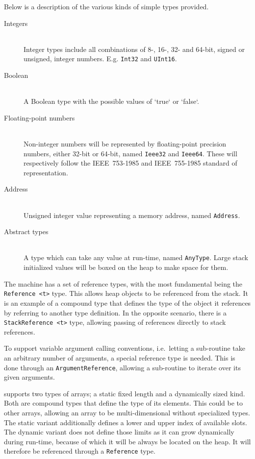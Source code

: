 Below is a description of the various kinds of simple types provided.

\begin{description}
\item[Integers] \hfill\\
  Integer types include all combinations of 8-, 16-, 32- and 64-bit, signed or
  unsigned, integer numbers. E.g. {\tt Int32} and {\tt UInt16}.

\item[Boolean] \hfill\\
  A Boolean type with the possible values of `true` or `false`.

\item[Floating-point numbers] \hfill\\
  Non-integer numbers will be represented by floating-point precision numbers,
  either 32-bit or 64-bit, named {\tt Ieee32} and {\tt Ieee64}. These will
  respectively follow the IEEE~753-1985 and IEEE~755-1985 standard of
  representation.

\item[Address] \hfill\\
  Unsigned integer value representing a memory address, named {\tt Address}.

\item[Abstract types] \hfill\\
  A type which can take any value at run-time, named {\tt AnyType}. Large stack
  initialized values will be boxed on the heap to make space for them.
\end{description}


The machine has a set of reference types, with the most fundamental being the
{\tt Reference <t>} type. This allows heap objects to be referenced from the
stack. It is an example of a compound type that defines the type of the object
it references by referring to another type definition. In the opposite scenario,
there is a {\tt StackReference <t>} type, allowing passing of references
directly to stack references.

To support variable argument calling conventions, i.e.~letting a sub-routine
take an arbitrary number of arguments, a special reference type is needed. This
is done through an {\tt ArgumentReference}, allowing a sub-routine to iterate
over its given arguments.


\thename{} supports two types of arrays; a static fixed length and a dynamically
sized kind. Both are compound types that define the type of its elements. This
could be to other arrays, allowing an array to be multi-dimensional without
specialized types. The static variant additionally defines a lower and upper
index of available slots. The dynamic variant does not define those limits as it
can grow dynamically during run-time, because of which it will be always be
located on the heap. It will therefore be referenced through a {\tt Reference}
type.

